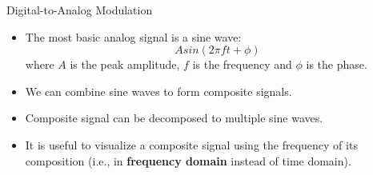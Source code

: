 %


\begin{cf}{
	Digital-to-Analog Modulation
}
\end{cf}

\begin{cf}{\small
	\begin{itemize}
	\item The most basic analog signal is a sine wave:
	\[
		A sin(2\pi ft + \phi)
	\]
	where $A$ is the peak amplitude, $f$ is the frequency and $\phi$ is the phase.
	\end{itemize}
}
\end{cf}

\begin{cf}{

}
\end{cf}

\begin{cf}{\small
	\begin{itemize}
	\item We can combine sine waves to form composite signals.
	\item Composite signal can be decomposed to multiple sine waves.
	\item It is useful to visualize a composite signal using the frequency of its composition (i.e., in \textbf{frequency domain} instead of time domain).
	\end{itemize}
}
\end{cf}

